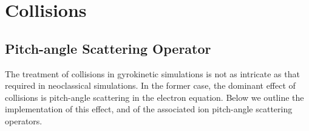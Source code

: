 \chapter{Collisions}\label{chap.collision}

\section{Pitch-angle Scattering Operator}

The treatment of collisions in gyrokinetic simulations is not 
as intricate as that required in neoclassical simulations.
In the former case, the dominant effect of collisions is 
pitch-angle scattering in the electron equation.  Below we 
outline the implementation of this effect, and of the 
associated ion pitch-angle scattering operators.


